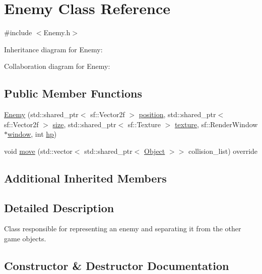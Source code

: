 \hypertarget{classEnemy}{}\section{Enemy Class Reference}
\label{classEnemy}


{\ttfamily \#include $<$Enemy.\+h$>$}



Inheritance diagram for Enemy\+:


Collaboration diagram for Enemy\+:
\subsection*{Public Member Functions}
\begin{DoxyCompactItemize}
\item 
\hyperlink{classEnemy_a044841c182933079207e692610f82aa4}{Enemy} (std\+::shared\+\_\+ptr$<$ sf\+::\+Vector2f $>$ \hyperlink{classObject_a8b1724482fb412feb64a638038161b7a}{position}, std\+::shared\+\_\+ptr$<$ sf\+::\+Vector2f $>$ \hyperlink{classObject_ac8bfde5d0428d9c091854fe1a09b7d9f}{size}, std\+::shared\+\_\+ptr$<$ sf\+::\+Texture $>$ \hyperlink{classObject_a8ff6491b841d0f48da3d98041fbca934}{texture}, sf\+::\+Render\+Window $\ast$\hyperlink{classObject_a5c6cfc086ea1e39e0b3cf8633a763bf8}{window}, int \hyperlink{classCharacter_a273353643988a87a0ce03cff3870b2d9}{hp})
\item 
void \hyperlink{classEnemy_a8e842aa8ab6c75f2c9d71c6c3f43d88c}{move} (std\+::vector$<$ std\+::shared\+\_\+ptr$<$ \hyperlink{classObject}{Object} $>$$>$ collision\+\_\+list) override
\end{DoxyCompactItemize}
\subsection*{Additional Inherited Members}


\subsection{Detailed Description}
Class responsible for representing an enemy and separating it from the other game objects. 

\subsection{Constructor \& Destructor Documentation}
\mbox{\label{classEnemy_a044841c182933079207e692610f82aa4}} 
